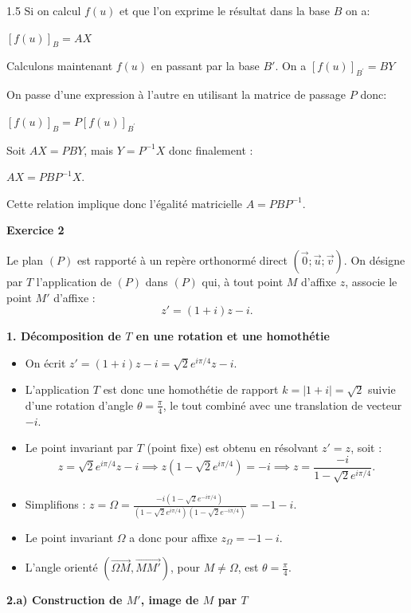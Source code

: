 \documentclass[12pt]{article}
\begin{document}
\begin{spacing}{1.5}
 Si on calcul $f(u)$ et que l'on exprime le résultat dans la base $B$ on a:
 
$ [f(u)]_B=AX$

 Calculons maintenant $f(u)$ en passant par la base $B'$. On a
$ [f(u)]_{B^{'}}=BY$
 
  On passe d'une expression à l'autre en utilisant la matrice de passage $P$ donc:

$ [f(u)]_B=P[f(u)]_{B^{'}}$

Soit $AX=PBY$, mais $Y=P^{-1}X$ donc finalement : 

$AX=PBP^{-1}X$.

Cette relation implique donc l'égalité matricielle $A=PBP^{-1}$.






\medskip\textbf{Exercice 2} 

Le plan $(P)$ est rapporté à un repère orthonormé direct $(\overrightarrow{0} ; \overrightarrow{u}; \overrightarrow{v})$. On désigne par \(T\) l'application de \((P)\) dans \((P)\) qui, à tout point \(M\) d'affixe \(z\), associe le point \(M'\) d'affixe : 
\[
z' = (1+i)z - i.
\]

\medskip
\textbf{1. Décomposition de \(T\) en une rotation et une homothétie}

\begin{itemize}
    \item On écrit \(z' = (1+i)z - i = \sqrt{2}e^{i\pi/4}z - i\).
    \item L'application \(T\) est donc une homothétie de rapport \(k = |1+i| = \sqrt{2}\) suivie d'une rotation d'angle \(\theta = \frac{\pi}{4}\), le tout combiné avec une translation de vecteur \(-i\).
    \item Le point invariant par \(T\) (point fixe) est obtenu en résolvant \(z' = z\), soit :
    \[
    z = \sqrt{2}e^{i\pi/4}z - i \implies z(1 - \sqrt{2}e^{i\pi/4}) = -i \implies z = \frac{-i}{1 - \sqrt{2}e^{i\pi/4}}.
    \]
    \item Simplifions : \(z = \Omega = \frac{-i(1 - \sqrt{2}e^{-i\pi/4})}{(1 - \sqrt{2}e^{i\pi/4})(1 - \sqrt{2}e^{-i\pi/4})} = -1 - i\).
    \item Le point invariant \(\Omega\) a donc pour affixe \(z_\Omega = -1 - i\).
    \item L'angle orienté \((\overrightarrow{\Omega M}, \overrightarrow{MM'})\), pour \(M \neq \Omega\), est \(\theta = \frac{\pi}{4}\).
\end{itemize}

\medskip
\textbf{2.a) Construction de \(M'\), image de \(M\) par \(T\)}


\end{spacing}
\end{document}
